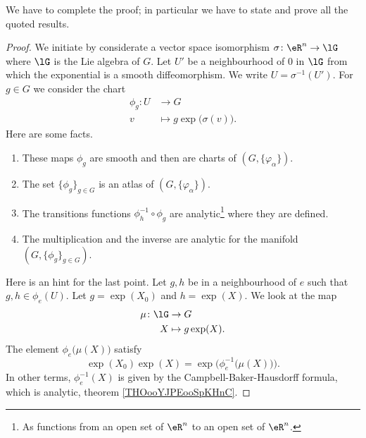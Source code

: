 \begin{theorem}
\begin{probleme}
	We have to complete the proof; in particular we have to state and prove all the quoted results.
\end{probleme}


\begin{proof}
	We initiate by considerate a vector space isomorphism \( \sigma\colon \eR^n\to \lG\) where \( \lG\) is the Lie algebra of \( G\). Let \( U'\) be a neighbourhood of \( 0\) in \( \lG\) from which the exponential is a smooth diffeomorphism. We write \( U=\sigma^{-1}(U')\). For \( g\in G\) we consider the chart
	\begin{equation}
		\begin{aligned}
			\phi_g\colon U & \to G                               \\
			v              & \mapsto g\exp\big( \sigma(v) \big).
		\end{aligned}
	\end{equation}
	Here are some facts.
	\begin{enumerate}
		\item
		      These maps \( \phi_g\) are smooth and then are charts of \( (G,\{ \varphi_{\alpha} \})\).
		\item
		      The set \( \{ \phi_g \}_{g\in G}\) is an atlas of \( (G,\{ \varphi_{\alpha} \})\).
		\item
		      The transitions functions \( \phi_h^{-1}\circ\phi_g\) are analytic\footnote{As functions from an open set of \( \eR^n\) to an open set of \( \eR^n\).} where they are defined.
		\item
		      The multiplication and the inverse are analytic for the manifold \( (G,\{ \phi_g \}_{g\in G})\).
	\end{enumerate}
	Here is an hint for the last point. Let \( g,h\) be in a neighbourhood of \( e\) such that \( g,h\in \phi_e(U)\). Let \( g=\exp(X_0)\) and \( h=\exp(X)\). We look at the map
	\begin{equation}
		\begin{aligned}
			\mu\colon \lG & \to G             \\
			X             & \mapsto g\exp(X).
		\end{aligned}
	\end{equation}
	The element \( \phi_e\big( \mu(X) \big)\) satisfy
	\begin{equation}
		\exp(X_0)\exp(X)=\exp\Big( \phi_e^{-1}\big( \mu(X) \big) \Big).
	\end{equation}
	In other terms, \( \phi_e^{-1}(X)\) is given by the Campbell-Baker-Hausdorff formula, which is analytic, theorem \ref{THOooYJPEooSpKHnC}.
\end{proof}


\end{theorem}
